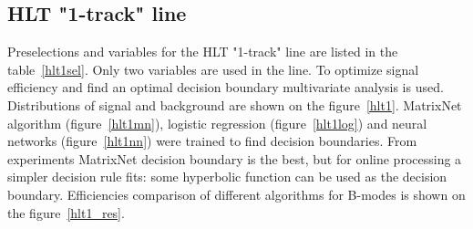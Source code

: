 \documentclass[a4paper]{jpconf}
\begin{document}
\subsection{HLT "1-track" line}
Preselections and variables for the HLT "1-track" line are listed in the table~\ref{hlt1sel}. Only two variables are used in the line. To optimize signal efficiency and find an optimal decision boundary multivariate analysis is used. Distributions of signal and background are shown on the figure~\ref{hlt1}. MatrixNet\cite{mn_paper} algorithm (figure~\ref{hlt1mn}), logistic regression (figure~\ref{hlt1log}) and neural networks (figure~\ref{hlt1nn}) were trained to find decision boundaries. From experiments MatrixNet decision boundary is the best, but for online processing a simpler decision rule fits: some hyperbolic function can be used as the decision boundary. Efficiencies comparison of different algorithms for B-modes is shown on the figure~\ref{hlt1_res}.
\end{document}
